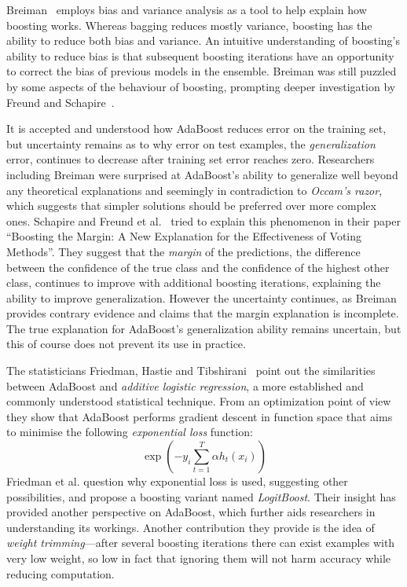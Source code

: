 Breiman~\cite{arcing} employs bias and variance analysis as a tool to help explain how boosting works. Whereas bagging reduces mostly variance, boosting has the ability to reduce both bias and variance. An intuitive understanding of boosting's ability to reduce bias is that subsequent boosting iterations have an opportunity to correct the bias of previous models in the ensemble. Breiman was still puzzled by some aspects of the behaviour of boosting, prompting deeper investigation by Freund and Schapire~\cite{arcingdiscuss}.

It is accepted and understood how AdaBoost reduces error on the training set, but uncertainty remains as to why error on test examples, the {\em generalization} error, continues to decrease after training set error reaches zero. Researchers including Breiman were surprised at AdaBoost's ability to generalize well beyond any theoretical explanations and seemingly in contradiction to {\em Occam's razor}, which suggests that simpler solutions should be preferred over more complex ones. Schapire and Freund et al.~\cite{boostingmargin} tried to explain this phenomenon in their paper ``Boosting the Margin: A New Explanation for the Effectiveness of Voting Methods''. They suggest that the {\em margin} of the predictions, the difference between the confidence of the true class and the confidence of the highest other class, continues to improve with additional boosting iterations, explaining the ability to improve generalization. However the uncertainty continues, as Breiman~\cite{arcingresponse, breimanpredgames} provides contrary evidence and claims that the margin explanation is incomplete. The true explanation for AdaBoost's generalization ability remains uncertain, but this of course does not prevent its use in practice.

The statisticians Friedman, Hastie and Tibshirani~\cite{logitboost} point out the
similarities between AdaBoost and {\em additive logistic regression}, a
more established and commonly understood statistical technique. From an
optimization point of view they show that AdaBoost performs gradient
descent in function space that aims to minimise the following {\em
exponential loss} function:
\begin{equation} \label{eq:exploss}
\exp \left( -y_{i} \sum_{t=1}^{T} \alpha h_{t}(x_{i}) \right)
\end{equation}
Friedman et al. question why exponential loss is used, suggesting other
possibilities, and propose a boosting variant named {\em LogitBoost}. Their insight has provided another perspective on AdaBoost,
which further aids researchers in understanding its workings. Another
contribution they provide is the idea of {\em weight trimming}---after
several boosting iterations there can exist examples with very low weight,
so low in fact that ignoring them will not harm accuracy while reducing
computation.

